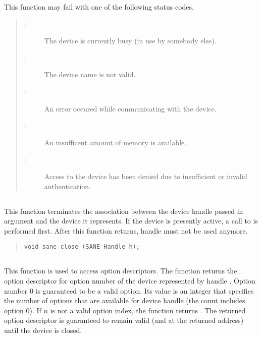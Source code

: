 \documentclass[11pt,DVIps]{report}
\begin{document}
This function may fail with one of the following status codes.
\begin{quote}
\begin{description}
\item[:] The device is currently
  busy (in use by somebody else).
\item[:] The device name is not valid.
\item[:] An error occured while
  communicating with the device.
\item[:] An insufficent amount of memory
  is available.
\item[:] Access to the device has
  been denied due to insufficient or invalid authentication.
\end{description}
\end{quote}


\subsection{}

This function terminates the association between the device handle
passed in argument  and the device it represents.  If the
device is presently active, a call to  is
performed first.  After this function returns, handle  must
not be used anymore.

\begin{quote}
\begin{verbatim}
void sane_close (SANE_Handle h);
\end{verbatim}
\end{quote}

\subsection{}

This function is used to access option descriptors.  The function
returns the option descriptor for option number  of the device
represented by handle .  Option number 0 is guaranteed to be a
valid option.  Its value is an integer that specifies the number of
options that are available for device handle  (the count
includes option 0).  If $n$ is not a valid option index, the function
returns .  The returned option descriptor is guaranteed to
remain valid (and at the returned address) until the device is closed.
\end{document}
